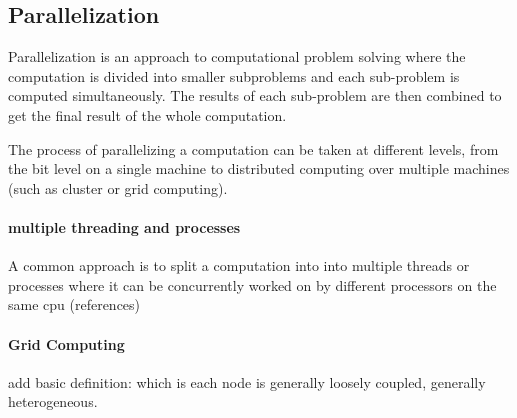 \subsection{Parallelization}

Parallelization is an approach to computational problem solving where the computation is divided into smaller 
subproblems and each sub-problem is computed simultaneously. The results of each sub-problem are then combined 
to get the final result of the whole computation.

The process of parallelizing a computation can be taken at different levels, from the bit level on a single machine 
to distributed computing over multiple machines (such as cluster or grid computing).

\paragraph{multiple threading and processes}
A common approach is to split a computation into into multiple threads or processes where it can be concurrently 
worked on by different processors on the same cpu (references)

\paragraph{Grid Computing}
add basic definition: which is each node is generally loosely coupled, generally heterogeneous.